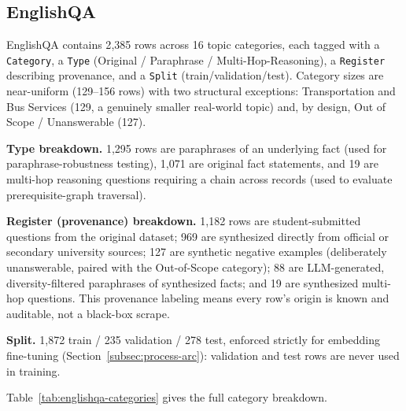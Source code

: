 \documentclass[a4paper,twoside]{article}
\begin{document}
\subsection{EnglishQA}
\label{subsec:englishqa}

EnglishQA contains 2{,}385 rows across 16 topic categories, each tagged with a \texttt{Category}, a \texttt{Type} (Original / Paraphrase / Multi-Hop-Reasoning), a \texttt{Register} describing provenance, and a \texttt{Split} (train/validation/test). Category sizes are near-uniform (129--156 rows) with two structural exceptions: Transportation and Bus Services (129, a genuinely smaller real-world topic) and, by design, Out of Scope / Unanswerable (127).

\textbf{Type breakdown.} 1{,}295 rows are paraphrases of an underlying fact (used for paraphrase-robustness testing), 1{,}071 are original fact statements, and 19 are multi-hop reasoning questions requiring a chain across records (used to evaluate prerequisite-graph traversal).

\textbf{Register (provenance) breakdown.} 1{,}182 rows are student-submitted questions from the original dataset; 969 are synthesized directly from official or secondary university sources; 127 are synthetic negative examples (deliberately unanswerable, paired with the Out-of-Scope category); 88 are LLM-generated, diversity-filtered paraphrases of synthesized facts; and 19 are synthesized multi-hop questions. This provenance labeling means every row's origin is known and auditable, not a black-box scrape.

\textbf{Split.} 1{,}872 train / 235 validation / 278 test, enforced strictly for embedding fine-tuning (Section~\ref{subsec:process-arc}): validation and test rows are never used in training.

Table~\ref{tab:englishqa-categories} gives the full category breakdown.
\end{document}
